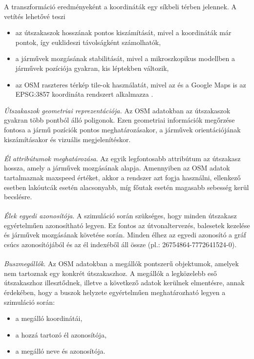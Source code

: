 \documentclass[14pt,a4paper]{extarticle}
\begin{document}
A transzformáció eredményeként a koordináták egy síkbeli térben jelennek. A vetítés lehetővé teszi
\begin{itemize}
    \item az útszakaszok hosszának pontos kiszámítását, mivel a koordináták már pontok, így euklideszi távolságként számolhatók,
    \item a járművek mozgásának stabilitását, mivel a mikroszkopikus modellben a járművek pozíciója gyakran, kis léptekben változik,
    \item az OSM raszteres térkép tile-ok használatát, mivel az és a Google Maps is az EPSG:3857 koordináta rendszert alkalmazza \cite{ref8} \cite{ref9}.
\end{itemize}
\textit{Útszakaszok geometriai reprezentációja.} Az OSM adatokban az útszakaszok gyakran több pontból álló poligonok. Ezen geometriai információk megőrzése fontosa a jármű pozíciók pontos meghatározásakor, a járművek orientációjának kiszámításakor és vizuális megjelenítéskor.
\\
\\
\textit{Él attribútumok meghatározása}. Az egyik legfontosabb attribútum az útszakasz hossza, amely a járművek mozgásának alapja. Amennyiben az OSM adatok tartalmaznak maxspeed értéket, akkor a rendszer azt fogja használni, ellenkező esetben lakóutcák esetén alacsonyabb, míg főutak esetén magasabb sebesség kerül becslésre. 
\\
\\
\textit{Élek egyedi azonosítója}. A szimuláció során szükséges, hogy minden útszakasz egyértelműen azonosítható legyen. Ez fontos az útvonaltervezés, balesetek kezelése és járművek mozgásának követése során. Minden élhez az egyedi azonosító a gráf csúcs azonosítójából és az él indexéből áll össze (pl.: 26754864-7772641524-0).
\\
\\
\textit{Buszmegállók}.  Az OSM adatokban a megállók pontszerű objektumok, amelyek nem tartoznak egy konkrét útszakaszhoz. A megállók a legközelebb eső útszakaszhoz illesztődnek, illetve a következő adatok kerülnek elmentésre, annak érdekében, hogy a buszok helyzete egyértelműen meghatározható legyen a szimuláció során:
\begin{itemize}
    \item a megálló koordinátái,
    \item a hozzá tartozó él azonosítója,
    \item a megálló neve és azonosítója.
\end{itemize}
\end{document}
